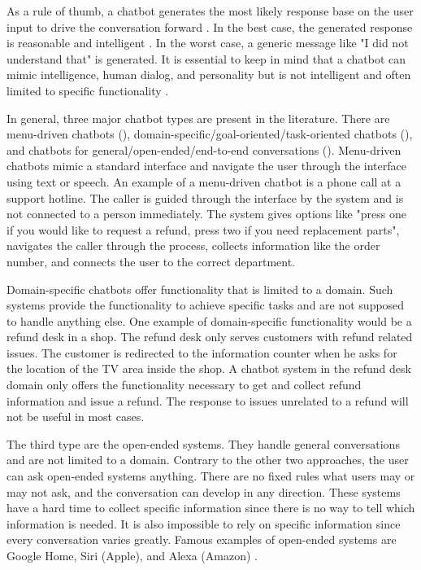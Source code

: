 As a rule of thumb, a chatbot generates the most likely response base on the user input to drive the conversation forward \cite{dutta2017developing}.
In the best case, the generated response is reasonable and intelligent \cite{vrajitoru2004evolutionary}. 
In the worst case, a generic message like "I did not understand that" is generated.
It is essential to keep in mind that a chatbot can mimic intelligence, human dialog, and personality but is not intelligent and often limited to specific functionality \cite{kane2016role, dutta2017developing}.

In general, three major chatbot types are present in the literature.
There are menu-driven chatbots (\citet{singhbuilding}), domain-specific/goal-oriented/task-oriented chatbots (\citet{deshpande2017survey, luis2015williams, braunEvaluatingNLU, williams2017hybrid}),
and chatbots for general/open-ended/end-to-end conversations (\citet{brandtzaeg2018chatbots, singhbuilding}).
Menu-driven chatbots mimic a standard interface and navigate the user through the interface using text or speech.
An example of a menu-driven chatbot is a phone call at a support hotline.
The caller is guided through the interface by the system and is not connected to a person immediately.
The system gives options like "press one if you would like to request a refund, press two if you need replacement parts", navigates the caller through the process, collects information like the order number, and 
connects the user to the correct department.

Domain-specific chatbots offer functionality that is limited to a domain.
Such systems provide the functionality to achieve specific tasks and are not supposed to handle anything else.
One example of domain-specific functionality would be a refund desk in a shop.
The refund desk only serves customers with refund related issues.
The customer is redirected to the information counter when he asks for the location of the TV area inside the shop.
A chatbot system in the refund desk domain only offers the functionality necessary to get and collect refund information and issue a refund. 
The response to issues unrelated to a refund will not be useful in most cases.

The third type are the open-ended systems.
They handle general conversations and are not limited to a domain.
Contrary to the other two approaches, the user can ask open-ended systems anything. 
There are no fixed rules what users may or may not ask, and the conversation can develop in any direction.
These systems have a hard time to collect specific information since there is no way to tell which information is needed.
It is also impossible to rely on specific information since every conversation varies greatly.
Famous examples of open-ended systems are Google Home, Siri (Apple), and Alexa (Amazon) \cite{singhbuilding}.

